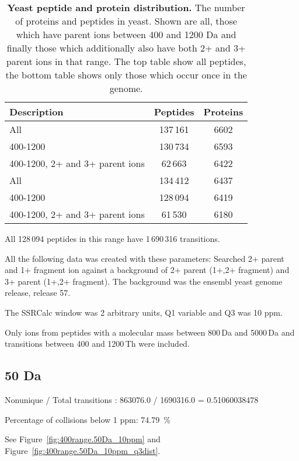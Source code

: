 \begin{table}[h]

\centering
\caption[Yeast peptide and protein distribution.]
{\textbf{Yeast peptide and protein distribution.}
The number of proteins and peptides in yeast. Shown are all, those which have
parent ions between 400 and 1200 Da and finally those which additionally also
have both 2+ and 3+ parent ions in that range. \newline
The top table show all peptides, the bottom table shows only those which occur
once in the genome.
}
\label{tab:yeast_pepprot}

\begin{tabular}{ l c c }
\maketablespace
Description & Peptides  & Proteins \\
\toprule
All & 137\,161 & 6602 \\
400-1200 & 130\,734 & 6593 \\
400-1200, 2+ and 3+ parent ions & \phantom{1}62\,663 & 6422\\
\toprule
All & 134\,412 & 6437 \\
400-1200 & 128\,094 & 6419 \\
400-1200, 2+ and 3+ parent ions & \phantom{1}61\,530 & 6180\\

\end{tabular}
\end{table}

All 128\,094 peptides in this range have 1\,690\,316 transitions.

All the following data was created with these parameters: 
Searched 2+ parent and 1+ fragment ion against a background of 2+ parent (1+,2+
fragment) and 3+ parent (1+,2+ fragment). The background was the ensembl yeast
genome release, release 57.

The SSRCalc window was 2 arbitrary units, Q1 variable and Q3 was 10 ppm.

Only ions from peptides with a molecular mass between 800\,Da and 5000\,Da 
and transitions between 400 and 1200\,Th were included. 
\subsection{50 Da}

Nonunique / Total transitions : 863076.0 / 1690316.0 = 0.51060038478

Percentage of collisions below 1 ppm: 74.79~\%


See Figure~\ref{fig:400range.50Da_10ppm} and Figure~\ref{fig:400range.50Da_10ppm_q3dist}.

